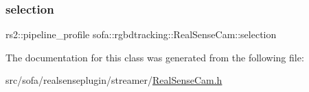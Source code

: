 \subsubsection{\texorpdfstring{selection}{selection}}
{\footnotesize\ttfamily rs2\+::pipeline\+\_\+profile sofa\+::rgbdtracking\+::\+Real\+Sense\+Cam\+::selection}



The documentation for this class was generated from the following file\+:\begin{DoxyCompactItemize}
\item 
src/sofa/realsenseplugin/streamer/\hyperlink{_real_sense_cam_8h}{Real\+Sense\+Cam.\+h}\end{DoxyCompactItemize}
